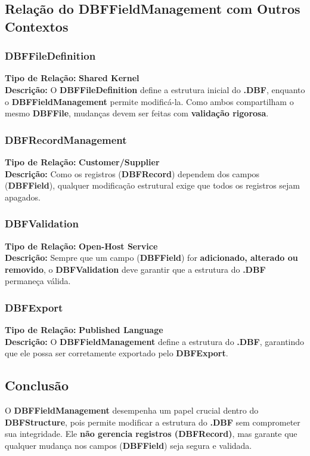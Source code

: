 \subsection{Relação do DBFFieldManagement com Outros Contextos}

\subsubsection{DBFFileDefinition}
\textbf{Tipo de Relação:} \textbf{Shared Kernel} \\
\textbf{Descrição:} O \textbf{DBFFileDefinition} define a estrutura inicial do \textbf{.DBF}, enquanto o \textbf{DBFFieldManagement} permite modificá-la. Como ambos compartilham o mesmo \textbf{DBFFile}, mudanças devem ser feitas com \textbf{validação rigorosa}.

\subsubsection{DBFRecordManagement}
\textbf{Tipo de Relação:} \textbf{Customer/Supplier} \\
\textbf{Descrição:} Como os registros (\textbf{DBFRecord}) dependem dos campos (\textbf{DBFField}), qualquer modificação estrutural exige que todos os registros sejam apagados.

\subsubsection{DBFValidation}
\textbf{Tipo de Relação:} \textbf{Open-Host Service} \\
\textbf{Descrição:} Sempre que um campo (\textbf{DBFField}) for \textbf{adicionado, alterado ou removido}, o \textbf{DBFValidation} deve garantir que a estrutura do \textbf{.DBF} permaneça válida.

\subsubsection{DBFExport}
\textbf{Tipo de Relação:} \textbf{Published Language} \\
\textbf{Descrição:} O \textbf{DBFFieldManagement} define a estrutura do \textbf{.DBF}, garantindo que ele possa ser corretamente exportado pelo \textbf{DBFExport}.

\subsection{Conclusão}
O \textbf{DBFFieldManagement} desempenha um papel crucial dentro do \textbf{DBFStructure}, pois permite modificar a estrutura do \textbf{.DBF} sem comprometer sua integridade. Ele \textbf{não gerencia registros (\textbf{DBFRecord})}, mas garante que qualquer mudança nos campos (\textbf{DBFField}) seja segura e validada.

